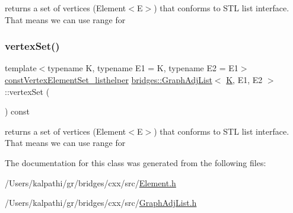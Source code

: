 returns a set of vertices (Element$<$\+E$>$) that conforms to S\+TL list interface. That means we can use range for 

\mbox{\label{classbridges_1_1_graph_adj_list_a629eb850df8bad758a848e8311069a63}} 
\subsubsection{\texorpdfstring{vertexSet()}{vertexSet()}\hspace{0.1cm}{\footnotesize\ttfamily [2/2]}}
{\footnotesize\ttfamily template$<$typename K, typename E1 = K, typename E2 = E1$>$ \\
\mbox{\hyperlink{classbridges_1_1_graph_adj_list_1_1const_vertex_element_set__listhelper}{const\+Vertex\+Element\+Set\+\_\+listhelper}} \mbox{\hyperlink{classbridges_1_1_graph_adj_list}{bridges\+::\+Graph\+Adj\+List}}$<$ \mbox{\hyperlink{namespacebridges_acfb0a4f7877d8f63de3e6862004c50edaa5f3c6a11b03839d46af9fb43c97c188}{K}}, E1, E2 $>$\+::vertex\+Set (\begin{DoxyParamCaption}{ }\end{DoxyParamCaption}) const\hspace{0.3cm}{\ttfamily [inline]}}



returns a set of vertices (Element$<$\+E$>$) that conforms to S\+TL list interface. That means we can use range for 



The documentation for this class was generated from the following files\+:\begin{DoxyCompactItemize}
\item 
/\+Users/kalpathi/gr/bridges/cxx/src/\mbox{\hyperlink{_element_8h}{Element.\+h}}\item 
/\+Users/kalpathi/gr/bridges/cxx/src/\mbox{\hyperlink{_graph_adj_list_8h}{Graph\+Adj\+List.\+h}}\end{DoxyCompactItemize}
